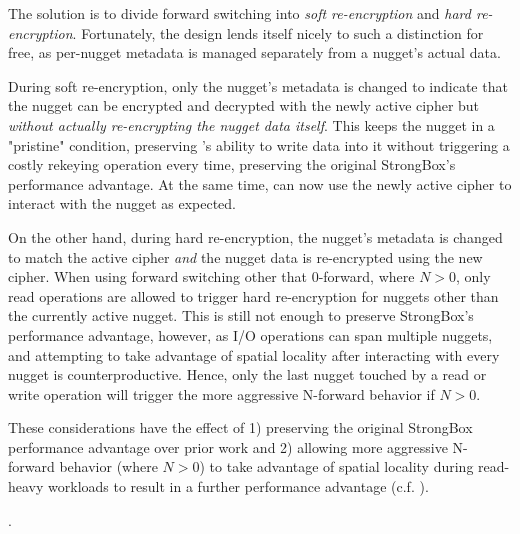 {The solution is to divide forward switching into \emph{soft re-encryption} and
\emph{hard re-encryption}. Fortunately, the \SYSTEM{} design lends itself nicely
to such a distinction for free, as per-nugget metadata is managed separately
from a nugget's actual data.

During soft re-encryption, only the nugget's metadata is changed to indicate
that the nugget can be encrypted and decrypted with the newly active cipher but
\emph{without actually re-encrypting the nugget data itself}. This keeps the
nugget in a "pristine" condition, preserving \SYSTEM{}'s ability to write data
into it without triggering a costly rekeying operation every time, preserving
the original StrongBox's performance advantage. At the same time, \SYSTEM{} can
now use the newly active cipher to interact with the nugget as expected.

On the other hand, during hard re-encryption, the nugget's metadata is changed
to match the active cipher \emph{and} the nugget data is re-encrypted using the
new cipher. When using forward switching other that 0-forward, 
where $N > 0$, only read operations are allowed to trigger hard re-encryption
for nuggets other than the currently active nugget. This is still not enough to
preserve StrongBox's performance advantage, however, as I/O operations can span
multiple nuggets, and attempting to take advantage of spatial locality after
interacting with every nugget is counterproductive. Hence, only the last nugget
touched by a read or write operation will trigger the more aggressive N-forward
behavior if $N > 0$.

These considerations have the effect of 1) preserving the original StrongBox
performance advantage over prior work and 2) allowing more aggressive N-forward
behavior (where $N > 0$) to take advantage of spatial locality during read-heavy
workloads to result in a further performance advantage (c.f.
).



.

}
